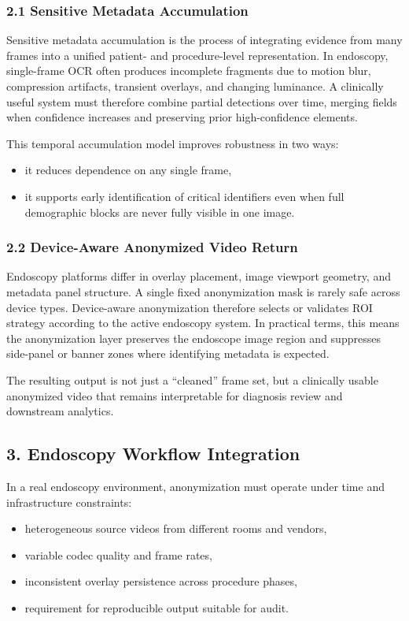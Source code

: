 \subsubsection*{2.1 Sensitive Metadata Accumulation}
Sensitive metadata accumulation is the process of integrating evidence from many
frames into a unified patient- and procedure-level representation. In endoscopy,
single-frame OCR often produces incomplete fragments due to motion blur,
compression artifacts, transient overlays, and changing luminance. A clinically
useful system must therefore combine partial detections over time, merging
fields when confidence increases and preserving prior high-confidence elements.

This temporal accumulation model improves robustness in two ways:
\begin{itemize}
  \item it reduces dependence on any single frame,
  \item it supports early identification of critical identifiers even when full
  demographic blocks are never fully visible in one image.
\end{itemize}

\subsubsection*{2.2 Device-Aware Anonymized Video Return}
Endoscopy platforms differ in overlay placement, image viewport geometry, and
metadata panel structure. A single fixed anonymization mask is rarely safe
across device types. Device-aware anonymization therefore selects or validates
ROI strategy according to the active endoscopy system. In practical terms, this
means the anonymization layer preserves the endoscope image region and suppresses
side-panel or banner zones where identifying metadata is expected.

The resulting output is not just a ``cleaned'' frame set, but a clinically
usable anonymized video that remains interpretable for diagnosis review and
downstream analytics.

\subsection*{3. Endoscopy Workflow Integration}
In a real endoscopy environment, anonymization must operate under time and
infrastructure constraints:
\begin{itemize}
  \item heterogeneous source videos from different rooms and vendors,
  \item variable codec quality and frame rates,
  \item inconsistent overlay persistence across procedure phases,
  \item requirement for reproducible output suitable for audit.
\end{itemize}

